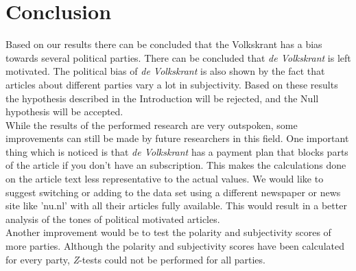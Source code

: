 \section{Conclusion}
Based on our results there can be concluded that the Volkskrant has a bias towards several political parties. There can be concluded that {\it de Volkskrant} is left motivated. The political bias of {\it de Volkskrant} is also shown by the fact that articles about different parties vary a lot in subjectivity. Based on these results the hypothesis described in the Introduction will be rejected, and the Null hypothesis will be accepted. \\

While the results of the performed research are very outspoken, some improvements can still be made by future researchers in this field. One important thing which is noticed is that {\it de Volkskrant} has a payment plan that blocks parts of the article if you don't have an subscription. This makes the calculations done on the article text less representative to the actual values. We would like to suggest switching or adding to the data set using a different newspaper or news site like 'nu.nl' with all their articles fully available. This would result in a better analysis of the tones of political motivated articles. \\

Another improvement would be to test the polarity and subjectivity scores of more parties. Although the polarity and subjectivity scores have been calculated for every party, {\it Z}-tests could not be performed for all parties.